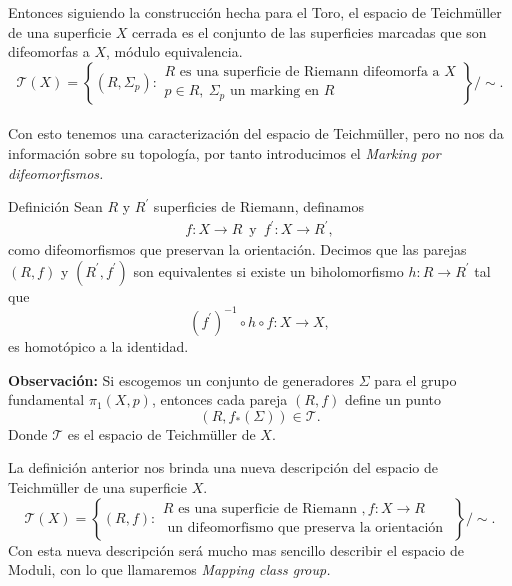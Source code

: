 \documentclass[xcolor=dvipsnames,10pt]{beamer}
\begin{document}
    \begin{frame}
        Entonces siguiendo la construcción hecha para el Toro, el espacio de Teichmüller de una superficie $X$ cerrada es el conjunto de las superficies marcadas que son difeomorfas a $X$, módulo equivalencia.
          $$\mathcal{T}(X)=\left\{(R, \Sigma_p): \begin{array}{c}R \text{ es una superficie de Riemann difeomorfa a }X  \\ p\in R,\ \Sigma_p\text{ un marking en } R\end{array}\right\} / \sim.$$\\
        \vspace{0.3cm}
        Con esto tenemos una caracterización del espacio de Teichmüller, pero no nos da información sobre su topología, por tanto introducimos el \textit{Marking por difeomorfismos.} 
    \end{frame}
    \begin{frame}
        \begin{block}{Definición}
            Sean $R$ y $R^\prime$ superficies de Riemann, definamos
            \begin{align*}
                 f:X\to R\,\text{  y  }\,f^\prime:X\to R^\prime,
             \end{align*} 
             como difeomorfismos que preservan la orientación. Decimos que las parejas $(R,f)$ y $(R^\prime,f^\prime)$ son equivalentes si existe un biholomorfismo $h:R\to R^\prime$ tal que
             $$(f^\prime)^{-1}\circ h\circ f:X\to X,$$
             es homotópico a la identidad.
        \end{block}
        \textbf{Observación:} Si escogemos un conjunto de generadores $\Sigma$ para el grupo fundamental $\pi_1(X,p)$, entonces cada pareja $(R,f)$ define un punto
        $$(R,f_{*}(\Sigma))\in \mathcal{T}.$$
        Donde $\mathcal{T}$ es el espacio de Teichmüller de $X.$
        
    \end{frame}
    \begin{frame}
        La definición anterior nos brinda una nueva descripción del espacio de Teichmüller de una superficie $X.$
        $$\mathcal{T}(X)=\left\{(R, f): \begin{array}{c}R \text{ es una superficie de Riemann }, f: X \rightarrow R \\ \text{ un difeomorfismo que preserva la orientación }\end{array}\right\} / \sim.$$
        Con esta nueva descripción será mucho mas sencillo describir el espacio de Moduli, con lo que llamaremos \textit{Mapping class group.}
    \end{frame}
\end{document}
